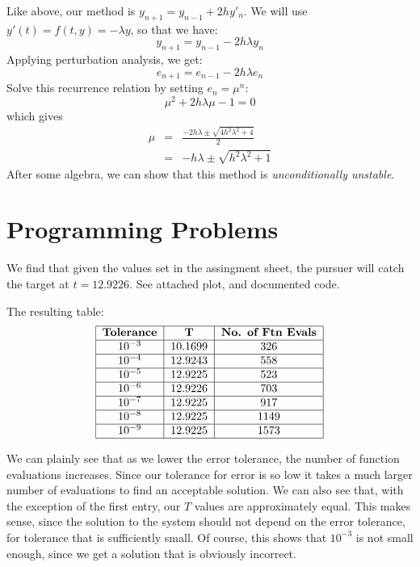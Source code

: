 \documentclass[12pt]{article}
\begin{document}
\begin{list}{.}{}
\begin{list}{)}{}
\item Like above, our method is $y_{n+1} = y_{n-1} + 2hy'_n$.  We will use
$y'(t) = f(t,y) = -\lambda y$, so that we have:
\[y_{n+1} = y_{n-1} - 2h\lambda y_n\]
Applying perturbation analysis, we get:
\[e_{n+1} = e_{n-1} - 2h\lambda e_n\]
Solve this recurrence relation by setting $e_n = \mu^n$:
\[\mu^2 + 2h\lambda\mu - 1 = 0\]
which gives
\begin{eqnarray*}
\mu &=& \frac{-2h\lambda \pm \sqrt{4h^2\lambda^2 + 4}}{2}\\
&=& -h\lambda \pm \sqrt{h^2\lambda^2 + 1}
\end{eqnarray*}
After some algebra, we can show that this method is \emph{unconditionally
unstable}.
\end{list}

\newpage
\section{Programming Problems}
\item We find that given the values set in the assingment sheet, the pursuer
will catch the target at $t = 12.9226$.  See attached plot, and documented code.

\item The resulting table:
\[
\begin{tabular}{|c|c|c|}
\hline
\textbf{Tolerance} & \textbf{T} & \textbf{No. of Ftn Evals}\\ \hline
$10^{-3}$ & 10.1699 & 326\\ \hline
$10^{-4}$ & 12.9243 & 558\\ \hline
$10^{-5}$ & 12.9225 & 523\\ \hline
$10^{-6}$ & 12.9226 & 703\\ \hline
$10^{-7}$ & 12.9225 & 917\\ \hline
$10^{-8}$ & 12.9225 & 1149\\ \hline
$10^{-9}$ & 12.9225 & 1573\\ \hline
\end{tabular}
\]

We can plainly see that as we lower the error tolerance, the number of function
evaluations increases.  Since our tolerance for error is so low it takes a much
larger number of evaluations to find an acceptable solution.  We can also see
that, with the exception of the first entry, our $T$ values are approximately
equal.  This makes sense, since the solution to the system should not depend on
the error tolerance, for tolerance that is sufficiently small.  Of course, this
shows that $10^{-3}$ is not small enough, since we get a solution that is
obviously incorrect.


\end{list}
\end{document}
